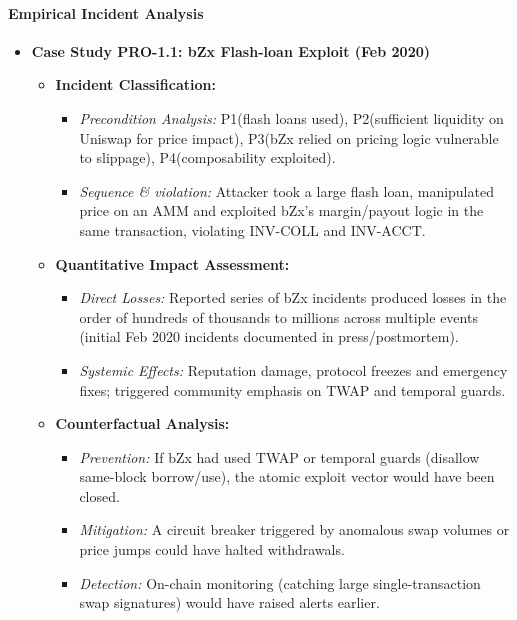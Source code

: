 \paragraph{Empirical Incident Analysis}

\begin{itemize}
    \item \textbf{Case Study PRO-1.1: bZx Flash-loan Exploit (Feb 2020)}
    \begin{itemize}
        \item \textbf{Incident Classification:}
            \begin{itemize}
                \item \textit{Precondition Analysis:} P1\checkmark (flash loans used), P2\checkmark (sufficient liquidity on Uniswap for price impact), P3\checkmark (bZx relied on pricing logic vulnerable to slippage), P4\checkmark (composability exploited). \cite{foxley2020flashloan}
                \item \textit{Sequence \& violation:} Attacker took a large flash loan, manipulated price on an AMM and exploited bZx's margin/payout logic in the same transaction, violating INV-COLL and INV-ACCT. \cite{foxley2020flashloan}
            \end{itemize}
        \item \textbf{Quantitative Impact Assessment:}
            \begin{itemize}
                \item \textit{Direct Losses:} Reported series of bZx incidents produced losses in the order of hundreds of thousands to millions across multiple events (initial Feb 2020 incidents documented in press/postmortem).
                \item \textit{Systemic Effects:} Reputation damage, protocol freezes and emergency fixes; triggered community emphasis on TWAP and temporal guards.
            \end{itemize}
        \item \textbf{Counterfactual Analysis:}
            \begin{itemize}
                \item \textit{Prevention:} If bZx had used TWAP or temporal guards (disallow same-block borrow/use), the atomic exploit vector would have been closed. \cite{werner2022sok}
                \item \textit{Mitigation:} A circuit breaker triggered by anomalous swap volumes or price jumps could have halted withdrawals.
                \item \textit{Detection:} On-chain monitoring (catching large single-transaction swap signatures) would have raised alerts earlier.

\end{itemize}
\end{itemize}
\end{itemize}
